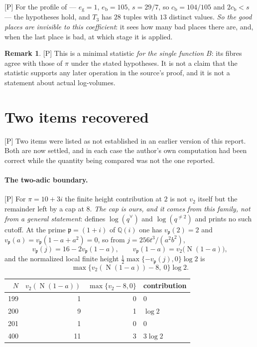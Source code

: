 \documentclass[11pt]{article}
\theoremstyle{plain}
\theoremstyle{definition}
\newtheorem{remark}{Remark}
\newcommand{\Norm}{\operatorname{N}}
\begin{document}
\textup{[P]} For the profile of \cite{Second} --- $e_{\mathrm g}=1$,
$e_{\mathrm b}=105$, $s=29/7$, so $c_{\mathrm b}=104/105$ and $2c_{\mathrm b}<s$ --- the
hypotheses hold, and $T_3$ has $28$ tuples with $13$ distinct values.  \emph{So the
good places are invisible to this coefficient}: it sees how many bad places there are,
and, when the last place is bad, at which stage it is applied.

\begin{remark}\label{r:statistic-scope}
\textup{[P]} This is a minimal statistic \emph{for the single function $B$}: its fibres
agree with those of $\pi$ under the stated hypotheses.  It is not a claim that the
statistic supports any later operation in the source's proof, and it is not a statement
about actual log-volumes.
\end{remark}

\section{Two items recovered}\label{s:recovered}

\textup{[P]} Two items were listed as not established in an earlier version of this
report.  Both are now settled, and in each case the author's own computation had been
correct while the quantity being compared was not the one reported.

\paragraph{The two-adic boundary.}
\textup{[P]} For $\pi=10+3i$ the finite height contribution at $2$ is not $v_2$ itself
but the remainder left by a cap at $8$.  \emph{The cap is ours, and it comes from this
family, not from a general statement}: \cite[Cor.~2.2(i)]{IUT4} defines
$\log(q^{\forall})$ and $\log(q^{\neq2})$ and prints no such cutoff.  At the prime
$\mathfrak{p}=(1+i)$ of $\mathbb{Q}(i)$ one has $v_{\mathfrak p}(2)=2$ and
$v_{\mathfrak p}(a)=v_{\mathfrak p}(1-a+a^2)=0$, so from $j=256t^3/(a^2b^2)$,
\[
 v_{\mathfrak p}(j)=16-2v_{\mathfrak p}(1-a),\qquad
 v_{\mathfrak p}(1-a)=v_2\bigl(\Norm(1-a)\bigr),
\]
and the normalized local finite height $\tfrac12\max\{-v_{\mathfrak p}(j),0\}\log2$ is
\[
 \max\bigl\{v_2(\Norm(1-a))-8,\ 0\bigr\}\log2 .
\]

\begin{center}
\begin{tabular}{rrrl}
\toprule
$N$ & $v_2(\Norm(1-a))$ & $\max\{v_2-8,0\}$ & contribution\\
\midrule
199 & 1 & 0 & $0$\\
200 & 9 & 1 & $\log2$\\
201 & 1 & 0 & $0$\\
400 & 11 & 3 & $3\log2$\\
\bottomrule
\end{tabular}
\end{center}
\end{document}
